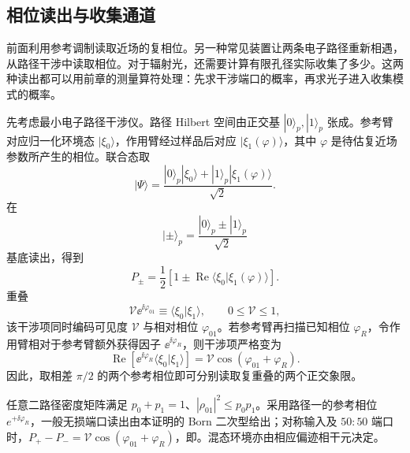 

\subsection{相位读出与收集通道}\label{subsec:phase-collection-dp19}

前面利用参考调制读取近场的复相位。另一种常见装置让两条电子路径重新相遇，从路径干涉中读取相位。对于辐射光，还需要计算有限孔径实际收集了多少。这两种读出都可以用前章的测量算符处理：先求干涉端口的概率，再求光子进入收集模式的概率。

\begin{proposition}
先考虑最小电子路径干涉仪。路径 Hilbert 空间由正交基 $|0\rangle_p,|1\rangle_p$ 张成。参考臂对应归一化环境态 $|\xi_0\rangle$，作用臂经过样品后对应 $|\xi_1(\varphi)\rangle$，其中 $\varphi$ 是待估复近场参数所产生的相位。联合态取
\begin{equation}
\boxed{
|\Psi\rangle
=\frac{|0\rangle_p|\xi_0\rangle
+|1\rangle_p|\xi_1(\varphi)\rangle}{\sqrt2}.}
\label{eq:path_environment_joint_state_dp68}
\end{equation}
在
\[
|\pm\rangle_p
=\frac{|0\rangle_p\pm|1\rangle_p}{\sqrt2}
\]
基底读出，得到
\begin{equation}
\boxed{
P_\pm
=\frac12\left[
1\pm\operatorname{Re}
\langle\xi_0|\xi_1(\varphi)\rangle
\right].}
\label{eq:path-phase-readout-dp19}
\end{equation}
重叠
\[
\mathcal V\ee^{\ii\varphi_{01}}
\equiv\langle\xi_0|\xi_1\rangle,
\qquad 0\le\mathcal V\le1,
\]
该干涉项同时编码可见度 $\mathcal V$ 与相对相位 $\varphi_{01}$。若参考臂再扫描已知相位 $\varphi_R$，令作用臂相对于参考臂额外获得因子 $\ee^{\ii\varphi_R}$，则干涉项严格变为
\[
\operatorname{Re}\!\left[\ee^{\ii\varphi_R}\langle\xi_0|\xi_1\rangle\right]
=\mathcal V\cos(\varphi_{01}+\varphi_R).
\]
因此，取相差 $\pi/2$ 的两个参考相位即可分别读取复重叠的两个正交象限。



任意二路径密度矩阵满足 $p_0+p_1=1$、$|\rho_{01}|^2\le p_0p_1$。采用路径一的参考相位 $e^{+\ii\varphi_R}$，一般无损端口读出由本证明的 Born 二次型给出；对称输入及 $50{:}50$ 端口时，$P_+-P_-=\mathcal V\cos(\varphi_{01}+\varphi_R)$，即。混态环境亦由相应偏迹相干元决定。
\end{proposition}
